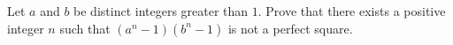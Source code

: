 Let $a$ and $b$ be distinct integers greater than $1$. Prove that there exists a positive integer $n$ such that $(a^n-1)(b^n-1)$ is not a perfect square.